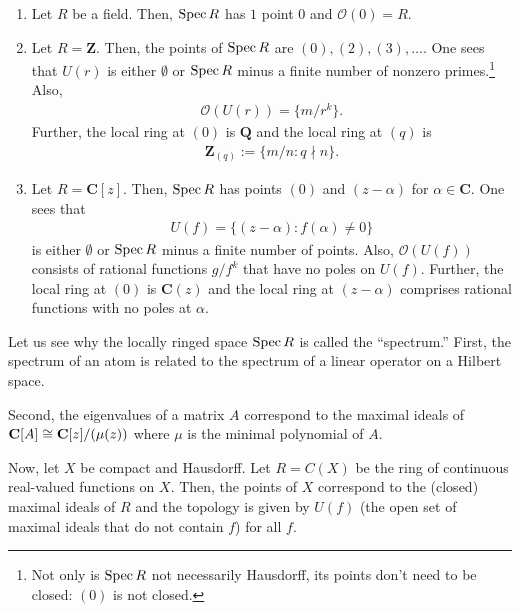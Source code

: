 \documentclass [11 pt, oneside] {article}
\begin{document}
\begin{example}[ ]\label{}\text{}
\begin{enumerate}
	\item Let $R$ be a field. Then, $\operatorname{Spec} R$ has $1$ point $0$ and $\mathscr{O}(0)= R$.
	\item Let $R=\mathbf{Z}$. Then, the points of $\operatorname{Spec} R$ are $(0),  (2),  (3),\hdots$. One sees that $U(r)$ is either $\emptyset$ or $\operatorname{Spec} R$ minus a finite number of nonzero primes.\footnote{Not only is $\operatorname{Spec} R$ not necessarily Hausdorff, its points don't need to be closed: $(0)$ is not closed.} Also,
		 \begin{align*}
		 	\mathscr{O}(U(r)) = \{ m/r^k\}.
		 \end{align*}
		 Further, the local ring at $(0)$ is $\mathbf{Q}$ and the local ring at $(q)$ is
		 \begin{align*}
		 	\mathbf{Z}_{(q)} := \{ m/n:q\nmid n\}.
		 \end{align*}
	 \item Let $R=\mathbf{C}[z]$. Then, $\operatorname{Spec} R$ has points $(0)$ and $(z-\alpha)$ for $\alpha\in \mathbf{C}$. One sees that 
\begin{align*}
	U(f)= \{ (z-\alpha) : f (\alpha)\ne 0\}
\end{align*}
is either $\emptyset$ or $\operatorname{Spec} R$ minus a finite number of points. Also, $\mathscr{O}(U(f))$ consists of rational functions $g/f^k$ that have no poles on $U(f)$. Further, the local ring at $(0)$ is $\mathbf{C}(z)$ and the local ring at $(z-\alpha)$ comprises rational functions with no poles at $\alpha$.
\end{enumerate}
\end{example}

Let us see why the locally ringed space $\operatorname{Spec} R$ is called the ``spectrum.'' First, the spectrum of an atom is related to the spectrum of a linear operator on a Hilbert space. 

Second, the eigenvalues of a matrix $A$ correspond to the maximal ideals of $\mathbf{C}[A]\cong \mathbf{C}[z]/(\mu(z))$ where $\mu$ is the minimal polynomial of $A$. 

Now, let $X$ be compact and Hausdorff. Let $R=C(X)$ be the ring of continuous real-valued functions on $X$. Then, the points of $X$ correspond to the (closed) maximal ideals of $R$ and the topology is given by $U(f)$ (the open set of maximal ideals that do not contain $f$) for all $f$.
\end{document}
